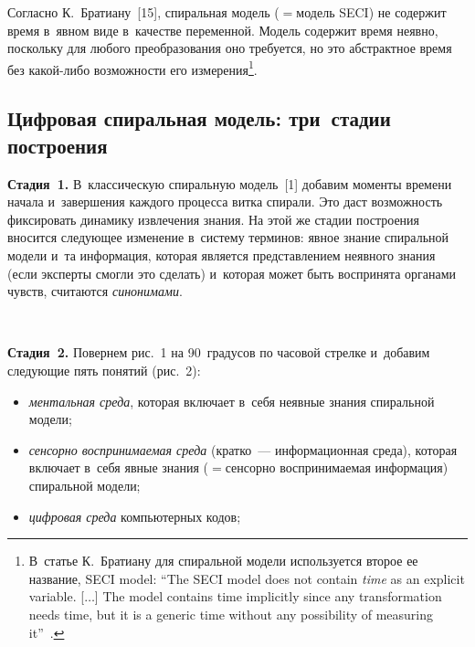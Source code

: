 \begin{multicols}{2}
  Согласно К.~Братиану~[15], спиральная модель ($=$\;модель SECI) не 
содержит время в~явном виде в~качестве переменной. Модель содержит время 
неявно, поскольку для любого преобразования оно требуется, но это 
абстрактное время без ка\-кой-ли\-бо воз\-мож\-ности его 
измерения\footnote{В~статье К.~Братиану для спиральной модели используется второе ее 
название, SECI model: ``The SECI model does not contain \textit{time} as an explicit variable. [$\ldots$] 
The model contains time implicitly since any transformation needs time, but it is a generic time without any 
possibility of measuring it''~\cite[p.~186]{15-zac}.}.
  
  
  \subsection{Цифровая спиральная модель: три~стадии построения} %
  
  \textbf{Стадия~1.} В~классическую спиральную модель~[1] добавим 
моменты времени начала и~завершения каждого процесса витка спирали. Это 
даст воз\-мож\-ность фиксировать динамику извлечения знания. На этой же стадии 
построения вносится сле\-ду\-ющее изменение в~сис\-те\-му терминов: явное знание 
спиральной модели и~та информация, которая является пред\-став\-ле\-ни\-ем 
неявного знания (если эксперты смогли это сделать) и~которая может быть 
воспринята органами чувств, считаются \textit{синонимами}.

\begin{figure*} %
 \vspace*{1pt}
  \begin{center}
 \mbox{%
 \epsfxsize=128mm 
 }
\end{center}
\vspace*{-9pt}
\vspace*{-4pt}
\end{figure*}
  
  \textbf{Стадия~2.} Повернем рис.~1 на 90~градусов по часовой стрелке 
и~добавим следующие пять понятий (рис.~2):
  \begin{itemize}
  \item \textit{ментальная среда}, которая включает в~себя неявные знания 
спиральной модели;
  \item \textit{сенсорно воспринимаемая среда} (крат\-ко~--- информационная 
среда), которая включает в~себя явные знания ($=$\;сен\-сор\-но 
воспринимаемая информация) спиральной модели;
  \item \textit{цифровая среда} компьютерных кодов;
 

\end{itemize}
\end{multicols}
